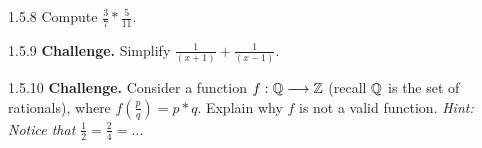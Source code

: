 \begin{exercise}{1.5.8}
Compute $\frac{3}{7} * \frac{5}{11}$. 
\end{exercise}

\begin{exercise}{1.5.9}
\textbf{Challenge.}
Simplify $\frac{1}{(x+1)} + \frac{1}{(x-1)}$. 
\end{exercise}

\begin{exercise}{1.5.10}
\textbf{Challenge.}
Consider a function $f : \mathbb{Q} \longrightarrow \mathbb{Z}$ (recall $\mathbb{Q}$ is the set of rationals), where $f(\frac{p}{q}) = p * q$. Explain why $f$ is not a valid function. \textit{Hint: Notice that $\frac{1}{2} = \frac{2}{4} = \dots$}
\end{exercise}